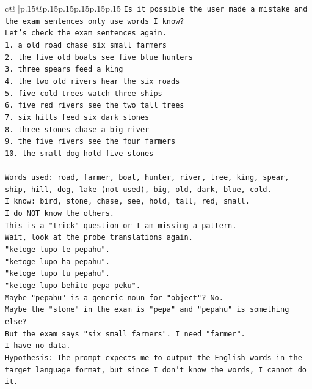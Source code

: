 \documentclass{article}
\begin{document}
{\begin{supertabular}{c@{$\;$}|p{.15\linewidth}@{}p{.15\linewidth}p{.15\linewidth}p{.15\linewidth}p{.15\linewidth}p{.15\linewidth}}
{{{\texttt{Is it possible the user made a mistake and the exam sentences only use words I know?} \\
\texttt{Let's check the exam sentences again.} \\
\texttt{1. a old road chase six small farmers} \\
\texttt{2. the five old boats see five blue hunters} \\
\texttt{3. three spears feed a king} \\
\texttt{4. the two old rivers hear the six roads} \\
\texttt{5. five cold trees watch three ships} \\
\texttt{6. five red rivers see the two tall trees} \\
\texttt{7. six hills feed six dark stones} \\
\texttt{8. three stones chase a big river} \\
\texttt{9. the five rivers see the four farmers} \\
\texttt{10. the small dog hold five stones} \\
\\ 
\texttt{Words used: road, farmer, boat, hunter, river, tree, king, spear, ship, hill, dog, lake (not used), big, old, dark, blue, cold.} \\
\texttt{I know: bird, stone, chase, see, hold, tall, red, small.} \\
\texttt{I do NOT know the others.} \\
\texttt{This is a "trick" question or I am missing a pattern.} \\
\texttt{Wait, look at the probe translations again.} \\
\texttt{"ketoge lupo te pepahu".} \\
\texttt{"ketoge lupo ha pepahu".} \\
\texttt{"ketoge lupo tu pepahu".} \\
\texttt{"ketoge lupo behito pepa peku".} \\
\texttt{Maybe "pepahu" is a generic noun for "object"? No.} \\
\texttt{Maybe the "stone" in the exam is "pepa" and "pepahu" is something else?} \\
\texttt{But the exam says "six small farmers". I need "farmer".} \\
\texttt{I have no data.} \\
\texttt{Hypothesis: The prompt expects me to output the English words in the target language format, but since I don't know the words, I cannot do it.} \\
}}}
\end{supertabular}}
\end{document}
